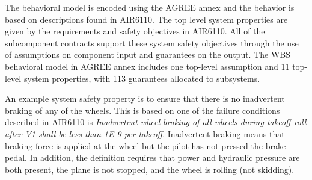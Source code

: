


The behavioral model is encoded using the AGREE annex and the behavior is based on descriptions found in AIR6110. The top level system properties are given by the requirements and safety objectives in AIR6110. All of the subcomponent contracts support these system safety objectives through the use of assumptions on component input and guarantees on the output. The WBS behavioral model in AGREE annex includes one top-level assumption and  11 top-level system properties, with 113 guarantees allocated to subsystems.  

An example system safety property is to ensure that there is no inadvertent braking of any of the wheels. This is based on one of the failure conditions described in AIR6110 is \textit{Inadvertent wheel braking of all wheels during takeoff roll after V1 shall be less than 1E-9 per takeoff}. 
Inadvertent braking means that braking force is applied at the wheel but the pilot has not pressed the brake pedal.  In addition, the definition requires that power and hydraulic pressure are both present, the plane is not stopped, and the wheel is rolling (not skidding).


